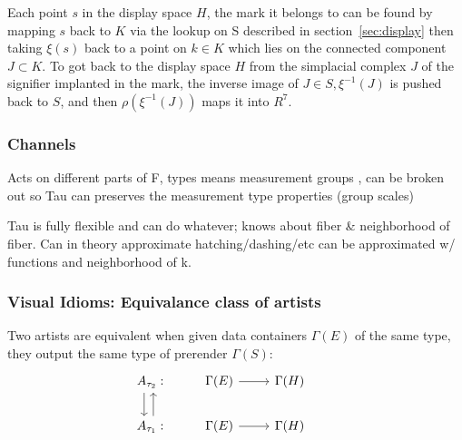 \documentclass[../main.tex]{subfiles}
\begin{document}
Each point $s$ in the display space $H$, the mark it belongs to can be found by mapping $s$ back to $K$ via the lookup on S described in section~\ref{sec:display} then taking $\xi(s)$ back to a point on $k \in K$ which lies on the connected component $J \subset K$. To got back to the display space $H$  from the simplacial complex $J$ of the signifier implanted in the mark, the inverse image of $J \in S, \xi^{-1}(J)$ is pushed back to $S$, and then  $\rho(\xi^{-1}(J))$ maps it into $R^{7}$. 



\subsubsection{Channels}
Acts on different parts of F, types means measurement groups , can be broken out so 
Tau can preserves the measurement type properties (group scales)


Tau is fully flexible and can do whatever; knows about fiber \& neighborhood of fiber. Can in theory approximate hatching/dashing/etc can be approximated w/ functions and neighborhood of k. 


\subsubsection{Visual Idioms: Equivalance class of artists}
Two artists are equivalent when given data containers $\Gamma(E)$ of the same type, they output the same type of prerender $\Gamma(S)$:
\begin{equation}
    \begin{tikzcd}
        A_{\tau_2}: \arrow[d, shift right=2] & \Gamma(E) \arrow[r] & \Gamma(H) &                                                \\
        A_{\tau_1}: \arrow[u, shift right]   & \Gamma(E) \arrow[r] & \Gamma(H) 
    \end{tikzcd}
\end{equation}
\end{document}
